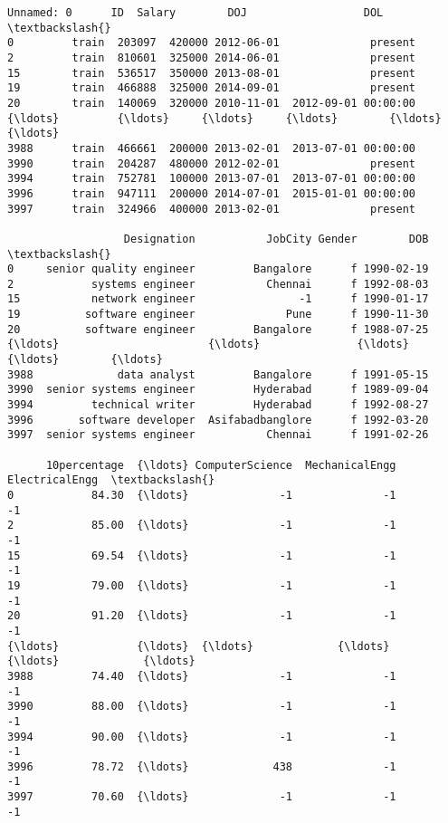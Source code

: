 \documentclass[11pt]{article}
\makeatletter
\newcommand{\boxspacing}{\kern\kvtcb@left@rule\kern\kvtcb@boxsep}
\newcommand{\prompt}[4]{
        \ttfamily\llap{{\color{#2}[#3]:\hspace{3pt}#4}}\vspace{-\baselineskip}
    }
\makeatother
\begin{document}
            \begin{tcolorbox}[breakable, size=fbox, boxrule=.5pt, pad at break*=1mm, opacityfill=0]
\prompt{Out}{outcolor}{54}{\boxspacing}
\begin{Verbatim}[commandchars=\\\{\}]
     Unnamed: 0      ID  Salary        DOJ                  DOL  \textbackslash{}
0         train  203097  420000 2012-06-01              present
2         train  810601  325000 2014-06-01              present
15        train  536517  350000 2013-08-01              present
19        train  466888  325000 2014-09-01              present
20        train  140069  320000 2010-11-01  2012-09-01 00:00:00
{\ldots}         {\ldots}     {\ldots}     {\ldots}        {\ldots}                  {\ldots}
3988      train  466661  200000 2013-02-01  2013-07-01 00:00:00
3990      train  204287  480000 2012-02-01              present
3994      train  752781  100000 2013-07-01  2013-07-01 00:00:00
3996      train  947111  200000 2014-07-01  2015-01-01 00:00:00
3997      train  324966  400000 2013-02-01              present

                  Designation           JobCity Gender        DOB  \textbackslash{}
0     senior quality engineer         Bangalore      f 1990-02-19
2            systems engineer           Chennai      f 1992-08-03
15           network engineer                -1      f 1990-01-17
19          software engineer              Pune      f 1990-11-30
20          software engineer         Bangalore      f 1988-07-25
{\ldots}                       {\ldots}               {\ldots}    {\ldots}        {\ldots}
3988             data analyst         Bangalore      f 1991-05-15
3990  senior systems engineer         Hyderabad      f 1989-09-04
3994         technical writer         Hyderabad      f 1992-08-27
3996       software developer  Asifabadbanglore      f 1992-03-20
3997  senior systems engineer           Chennai      f 1991-02-26

      10percentage  {\ldots} ComputerScience  MechanicalEngg  ElectricalEngg  \textbackslash{}
0            84.30  {\ldots}              -1              -1              -1
2            85.00  {\ldots}              -1              -1              -1
15           69.54  {\ldots}              -1              -1              -1
19           79.00  {\ldots}              -1              -1              -1
20           91.20  {\ldots}              -1              -1              -1
{\ldots}            {\ldots}  {\ldots}             {\ldots}             {\ldots}             {\ldots}
3988         74.40  {\ldots}              -1              -1              -1
3990         88.00  {\ldots}              -1              -1              -1
3994         90.00  {\ldots}              -1              -1              -1
3996         78.72  {\ldots}             438              -1              -1
3997         70.60  {\ldots}              -1              -1              -1


\end{Verbatim}
\end{tcolorbox}
\end{document}
